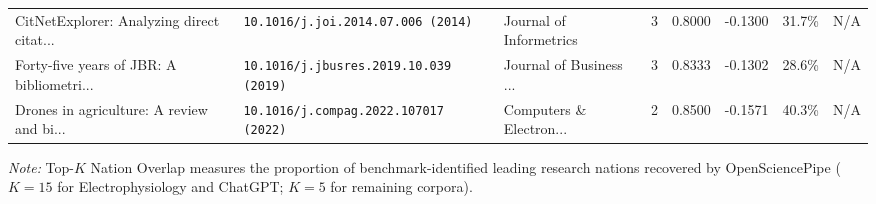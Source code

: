 \begin{table}[t]
{\begin{tabular}{p{4.2cm}p{3.0cm}p{2.4cm}ccccc}
CitNetExplorer: Analyzing direct citat... & {\footnotesize\nolinkurl{10.1016/j.joi.2014.07.006 (2014)}} & Journal of Informetrics & 3 & 0.8000 & -0.1300 & 31.7\% & N/A \\
Forty-five years of JBR: A bibliometri... & {\footnotesize\nolinkurl{10.1016/j.jbusres.2019.10.039 (2019)}} & Journal of Business ... & 3 & 0.8333 & -0.1302 & 28.6\% & N/A \\
Drones in agriculture: A review and bi... & {\footnotesize\nolinkurl{10.1016/j.compag.2022.107017 (2022)}} & Computers \& Electron... & 2 & 0.8500 & -0.1571 & 40.3\% & N/A \\
\hline
\end{tabular}%
}
\vspace{2pt}\par\raggedright\scriptsize\textit{Note:} Top-$K$ Nation Overlap measures the proportion of benchmark-identified leading research nations recovered by OpenSciencePipe ($K=15$ for Electrophysiology and ChatGPT; $K=5$ for remaining corpora).
\end{table}
